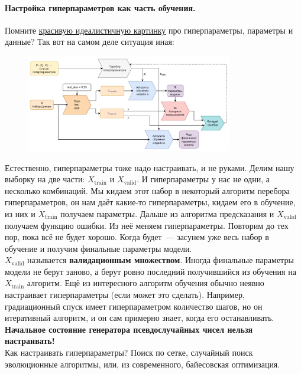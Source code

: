 \documentclass{article}
\begin{document}
    \paragraph{Настройка гиперпараметров как часть обучения.}
    Помните \hyperref[img:ml_scheme]{красивую идеалистичную картинку} про гиперпараметры, параметры и данные? Так вот на самом деле ситуация иная:
    \begin{figure}[H]
        \includegraphics[width=0.8\textwidth]{Images/ml_scheme_advanced}
    \end{figure}\noindent
    Естественно, гиперпараметры тоже надо настраивать, и не руками. Делим нашу выборку на две части: $X_{\mathrm{train}}$ и $X_{\mathrm{valid}}$. И гиперпараметры у нас не одни, а несколько комбинаций. Мы кидаем этот набор в некоторый алгоритм перебора гиперпараметров, он нам даёт какие-то гиперпараметры, кидаем его в обучение, из них и $X_{\mathrm{train}}$ получаем параметры. Дальше из алгоритма предсказания и $X_{\mathrm{valid}}$ получаем функцию ошибки. Из неё меняем гиперпараметры. Повторим до тех пор, пока всё не будет хорошо. Когда будет~--- засунем уже весь набор в обучение и получим финальные параметры модели.\\
    $X_{\mathrm{valid}}$ называется \textbf{валидационным множеством}. Иногда финальные параметры модели не берут заново, а берут ровно последний получившийся из обучения на $X_{\mathrm{train}}$ алгоритм. Ещё из интересного алгоритм обучения обычно неявно настраивает гиперпараметры (если может это сделать). Например, градиационный спуск имеет гиперпараметром количество шагов, но он итеративный алгоритм, и он сам примерно знает, когда его останавливать.\\
    \textbf{Начальное состояние генератора псевдослучайных чисел нельзя настраивать!}\\
    Как настраивать гиперпараметры? Поиск по сетке, случайный поиск эволюционные алгоритмы, или, из современного, байесовская оптимизация.
\end{document}
